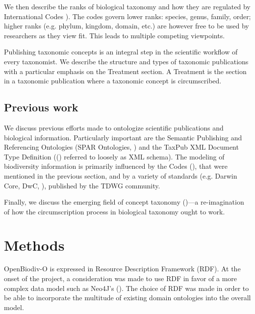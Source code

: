 We then describe the ranks of biological taxonomy and how they are regulated by International Codes \cite{international_commission_on_zoological_nomenclature_international_1999,mcneill_international_2012}). The codes govern lower ranks: species, genus, family, order; higher ranks (e.g. phylum, kingdom, domain, etc.) are however free to be used by researchers as they view fit. This leads to multiple competing viewpoints.

Publishing taxonomic concepts is an integral step in the scientific workflow of every taxonomist. We describe the structure and types of taxonomic publications with a particular emphasis on the Treatment section. A Treatment is the section in a taxonomic publication where a taxonomic concept is circumscribed.

\subsection*{Previous work}
We discuss previous efforts made to ontologize  scientific publications and biological information. Particularly important are the Semantic Publishing and Referencing Ontologies (SPAR Ontologies, \cite{peroni_semantic_2014}) and the TaxPub XML Document Type Definition ((\cite{catapano_taxpub:_2010}) referred to loosely as XML schema). The modeling of biodiversity information is primarily influenced by the Codes (\cite{international_commission_on_zoological_nomenclature_international_1999,mcneill_international_2012}), that were mentioned in the previous section, and by a variety of standards (e.g. Darwin Core, DwC, \cite{wieczorek_darwin_2012}), published by the TDWG community.

Finally, we discuss the emerging field of concept taxonomy (\cite{berendsohn_concept_1995, franz_perspectives:_2009,sterner_taxonomy_2017})---a re-imagination of how the circumscription process in biological taxonomy ought to work.

\section{Methods}

OpenBiodiv-O is expressed in Resource Description Framework (RDF). At the onset of the project, a consideration was made to use RDF in favor of a more complex data model such as Neo4J's (\cite{senderov_open_2016}). The choice of RDF was made in order to be able to incorporate the multitude of existing domain ontologies into the overall model.

